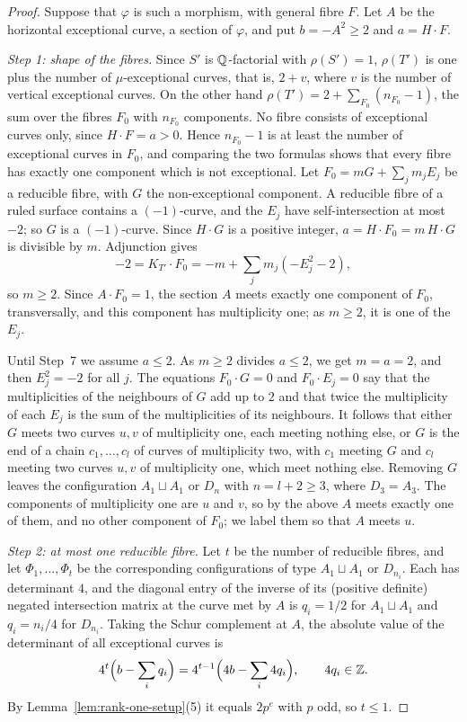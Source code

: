 \begin{proof}
Suppose that $\varphi$ is such a morphism, with general fibre $F$.
Let $A$ be the horizontal exceptional curve, a section of $\varphi$, and put $b = -A^2\geq 2$ and $a = H\cdot F$.

\emph{Step 1: shape of the fibres.}
Since $S'$ is $\mathbb{Q}$-factorial with $\rho(S') = 1$, $\rho(T')$ is one plus the number of $\mu$-exceptional curves, that is, $2+v$, where $v$ is the number of vertical exceptional curves.
On the other hand $\rho(T') = 2+\sum_{F_0}(n_{F_0}-1)$, the sum over the fibres $F_0$ with $n_{F_0}$ components.
No fibre consists of exceptional curves only, since $H\cdot F = a>0$.
Hence $n_{F_0}-1$ is at least the number of exceptional curves in $F_0$, and comparing the two formulas shows that every fibre has exactly one component which is not exceptional.
Let $F_0 = mG+\sum_jm_jE_j$ be a reducible fibre, with $G$ the non-exceptional component.
A reducible fibre of a ruled surface contains a $(-1)$-curve, and the $E_j$ have self-intersection at most $-2$; so $G$ is a $(-1)$-curve.
Since $H\cdot G$ is a positive integer, $a = H\cdot F_0 = m\,H\cdot G$ is divisible by $m$.
Adjunction gives
\[
  -2 = K_{T'}\cdot F_0 = -m+\sum_jm_j(-E_j^2-2),
\]
so $m\geq 2$.
Since $A\cdot F_0 = 1$, the section $A$ meets exactly one component of $F_0$, transversally, and this component has multiplicity one; as $m\geq 2$, it is one of the $E_j$.

Until Step~7 we assume $a\leq 2$.
As $m\geq 2$ divides $a\leq 2$, we get $m = a = 2$, and then $E_j^2 = -2$ for all $j$.
The equations $F_0\cdot G = 0$ and $F_0\cdot E_j = 0$ say that the multiplicities of the neighbours of $G$ add up to $2$ and that twice the multiplicity of each $E_j$ is the sum of the multiplicities of its neighbours.
It follows that either $G$ meets two curves $u,v$ of multiplicity one, each meeting nothing else, or $G$ is the end of a chain $c_1,\dots,c_l$ of curves of multiplicity two, with $c_1$ meeting $G$ and $c_l$ meeting two curves $u,v$ of multiplicity one, which meet nothing else.
Removing $G$ leaves the configuration $A_1\sqcup A_1$ or $D_n$ with $n = l+2\geq 3$, where $D_3 = A_3$.
The components of multiplicity one are $u$ and $v$, so by the above $A$ meets exactly one of them, and no other component of $F_0$; we label them so that $A$ meets $u$.

\emph{Step 2: at most one reducible fibre.}
Let $t$ be the number of reducible fibres, and let $\Phi_1,\dots,\Phi_t$ be the corresponding configurations of type $A_1\sqcup A_1$ or $D_{n_i}$.
Each has determinant $4$, and the diagonal entry of the inverse of its (positive definite) negated intersection matrix at the curve met by $A$ is $q_i = 1/2$ for $A_1\sqcup A_1$ and $q_i = n_i/4$ for $D_{n_i}$.
Taking the Schur complement at $A$, the absolute value of the determinant of all exceptional curves is
\[
  4^t\Bigl(b-\sum_iq_i\Bigr) = 4^{t-1}\Bigl(4b-\sum_i4q_i\Bigr),\qquad 4q_i\in\mathbb{Z}.
\]
By Lemma~\ref{lem:rank-one-setup}(5) it equals $2p^e$ with $p$ odd, so $t\leq 1$.


\end{proof}
